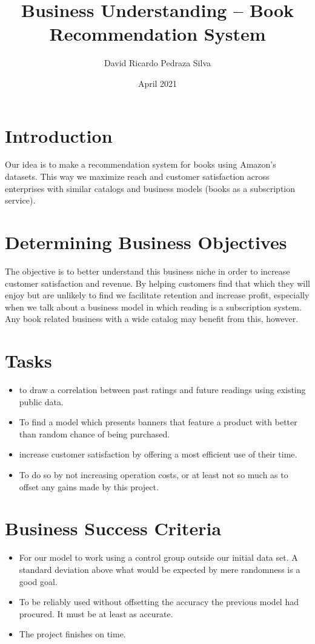 \documentclass{article}
\title{Business Understanding -- Book Recommendation System}
\author{David Ricardo Pedraza Silva }
\date{April 2021}
\begin{document}
\maketitle
\section*{Introduction}

Our idea is to make a recommendation system for books using Amazon's datasets. This way we maximize reach and customer satisfaction across enterprises with similar catalogs and business models (books as a subscription service).    

\section*{Determining Business Objectives}

The objective is to better understand this business niche in order to increase customer satisfaction and revenue. By helping customers find that which they will enjoy but are unlikely to find we facilitate retention and increase profit, especially when we talk about a business model in which reading is a subscription system. Any book related business with a wide catalog may benefit from this, however.
\section*{Tasks}
\begin{itemize}
    \item to draw a correlation between past ratings and future readings using existing public data.
    \item To find a model which presents banners that feature a product with better than random chance of being purchased.
    \item increase customer satisfaction by offering a most efficient use of their time.
    \item To do so by not increasing operation costs, or at least not so much as to offset any gains made by this project.
\end{itemize}
\section*{Business Success Criteria}
\begin{itemize}
    \item For our model to work using a control group outside our initial data set. A standard deviation above what would be expected by mere randomness is a good goal.
    \item To be reliably used without offsetting the accuracy the previous model had procured. It must be at least as accurate. 
    \item The project finishes on time.
\end{itemize}
\end{document}
